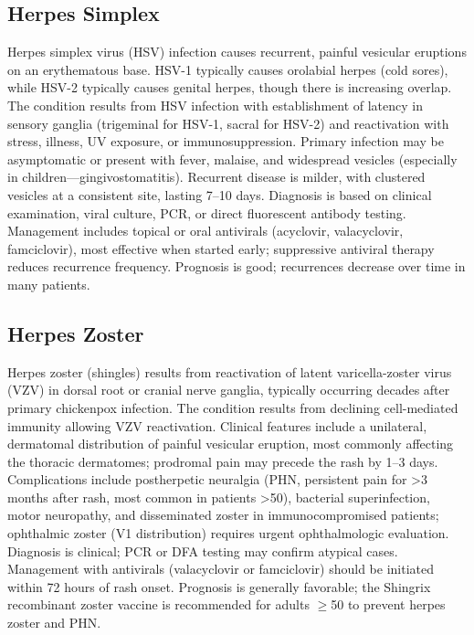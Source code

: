 \subsection{Herpes Simplex}
\label{sec:Herpes Simplex}
Herpes simplex virus (HSV) infection causes recurrent, painful vesicular eruptions on an erythematous base. HSV-1 typically causes orolabial herpes (cold sores), while HSV-2 typically causes genital herpes, though there is increasing overlap. The condition results from HSV infection with establishment of latency in sensory ganglia (trigeminal for HSV-1, sacral for HSV-2) and reactivation with stress, illness, UV exposure, or immunosuppression. Primary infection may be asymptomatic or present with fever, malaise, and widespread vesicles (especially in children---gingivostomatitis). Recurrent disease is milder, with clustered vesicles at a consistent site, lasting 7--10 days. Diagnosis is based on clinical examination, viral culture, PCR, or direct fluorescent antibody testing. Management includes topical or oral antivirals (acyclovir, valacyclovir, famciclovir), most effective when started early; suppressive antiviral therapy reduces recurrence frequency. Prognosis is good; recurrences decrease over time in many patients.

\subsection{Herpes Zoster}
\label{sec:Herpes Zoster}
Herpes zoster (shingles) results from reactivation of latent varicella-zoster virus (VZV) in dorsal root or cranial nerve ganglia, typically occurring decades after primary chickenpox infection. The condition results from declining cell-mediated immunity allowing VZV reactivation. Clinical features include a unilateral, dermatomal distribution of painful vesicular eruption, most commonly affecting the thoracic dermatomes; prodromal pain may precede the rash by 1--3 days. Complications include postherpetic neuralgia (PHN, persistent pain for >3 months after rash, most common in patients >50), bacterial superinfection, motor neuropathy, and disseminated zoster in immunocompromised patients; ophthalmic zoster (V1 distribution) requires urgent ophthalmologic evaluation. Diagnosis is clinical; PCR or DFA testing may confirm atypical cases. Management with antivirals (valacyclovir or famciclovir) should be initiated within 72 hours of rash onset. Prognosis is generally favorable; the Shingrix recombinant zoster vaccine is recommended for adults $\geq$50 to prevent herpes zoster and PHN.

